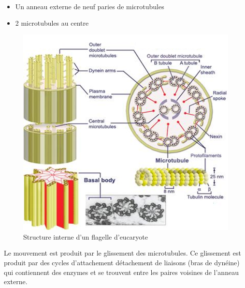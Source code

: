 \documentclass[
]{book}
\providecommand{\tightlist}{%
  \setlength{\itemsep}{0pt}\setlength{\parskip}{0pt}}
\begin{document}
\begin{itemize}
\tightlist
\item
  Un anneau externe de neuf paries de microtubules
\item
  2 microtubules au centre
\end{itemize}

\begin{figure}[H]

{\centering \includegraphics[width=11.5in]{images/flagelle1} 

}

\caption{Structure interne d'un flagelle d'eucaryote}\label{fig:flagelle}
\end{figure}

Le mouvement est produit par le glissement des microtubules. Ce glissement est produit par des cycles d'attachement détachement de liaisons (bras de dynéine) qui contiennent des enzymes et se trouvent entre les paires voisines de l'anneau externe.
\end{document}
